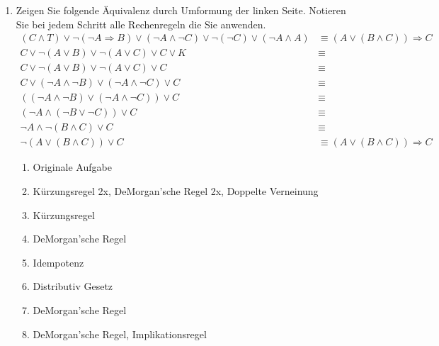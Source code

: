 \documentclass[a4paper,onecolumn,pdftex]{report}
\begin{document}
\begin{enumerate}
        \newpage
        \item Zeigen Sie folgende Äquivalenz durch Umformung der linken Seite. Notieren Sie bei jedem Schritt alle Rechenregeln die Sie anwenden.
        \begin{align}
            (C \wedge T) \lor \neg (\neg A \Rightarrow B) \lor (\neg A \wedge \neg C) \lor \neg (\neg C) \lor (\neg A \wedge A) &\equiv (A \lor (B \wedge C)) \Rightarrow C \\
            C \lor \neg (A \lor B) \lor \neg (A \lor C) \lor C \lor K &\equiv \\
            C \lor \neg (A \lor B) \lor \neg (A \lor C) \lor C &\equiv \\
            C \lor (\neg A \wedge \neg B) \lor (\neg A \wedge \neg C) \lor C &\equiv  \\
            ((\neg A \wedge \neg B) \lor (\neg A \wedge \neg C)) \lor C &\equiv \\
            (\neg A \wedge (\neg B \lor  \neg C)) \lor C &\equiv \\
            \neg A \wedge \neg (B \wedge C) \lor C &\equiv \\
            \neg (A \lor (B \wedge C)) \lor C &\equiv (A \lor (B \wedge C)) \Rightarrow C
        \end{align}

        \vspace{20px}
        \begin{enumerate}
            \item Originale Aufgabe
            \item K\"urzungsregel 2x, DeMorgan'sche Regel 2x, Doppelte Verneinung
            \item K\"urzungsregel
            \item DeMorgan'sche Regel
            \item Idempotenz
            \item Distributiv Gesetz
            \item DeMorgan'sche Regel
            \item DeMorgan'sche Regel, Implikationsregel
        \end{enumerate}
    \end{enumerate}
\end{document}
